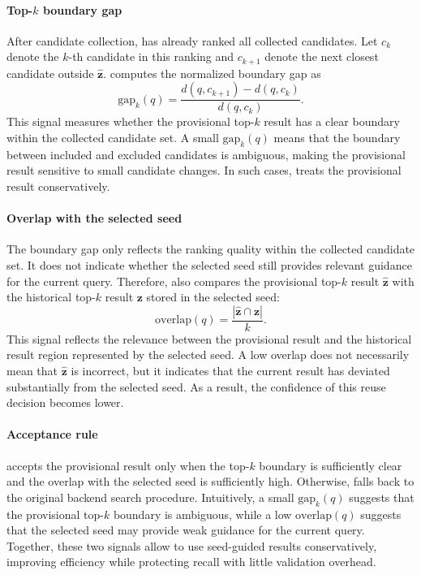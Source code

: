\paragraph{Top-$k$ boundary gap}
After candidate collection, \system has already ranked all collected candidates.
Let $c_k$ denote the $k$-th candidate in this ranking and $c_{k+1}$ denote the next closest candidate outside $\hat{\mathbf{z}}$.
\system computes the normalized boundary gap as
\begin{equation}
\mathrm{gap}_k(q)=
\frac{d(q,c_{k+1})-d(q,c_k)}
{d(q,c_k)}.
\end{equation}
This signal measures whether the provisional top-$k$ result has a clear boundary within the collected candidate set.
A small $\mathrm{gap}_k(q)$ means that the boundary between included and excluded candidates is ambiguous, making the provisional result sensitive to small candidate changes.
In such cases, \system treats the provisional result conservatively.

\paragraph{Overlap with the selected seed}
The boundary gap only reflects the ranking quality within the collected candidate set.
It does not indicate whether the selected seed still provides relevant guidance for the current query.
Therefore, \system also compares the provisional top-$k$ result $\hat{\mathbf{z}}$ with the historical top-$k$ result $\mathbf{z}$ stored in the selected seed:
\begin{equation}
\mathrm{overlap}(q)=
\frac{|\hat{\mathbf{z}}\cap \mathbf{z}|}{k}.
\end{equation}
This signal reflects the relevance between the provisional result and the historical result region represented by the selected seed.
A low overlap does not necessarily mean that $\hat{\mathbf{z}}$ is incorrect, but it indicates that the current result has deviated substantially from the selected seed.
As a result, the confidence of this reuse decision becomes lower.


\paragraph{Acceptance rule}
\system accepts the provisional result only when the top-$k$ boundary is sufficiently clear and the overlap with the selected seed is sufficiently high.
Otherwise, \system falls back to the original backend search procedure.
Intuitively, a small $\mathrm{gap}_k(q)$ suggests that the provisional top-$k$ boundary is ambiguous, while a low $\mathrm{overlap}(q)$ suggests that the selected seed may provide weak guidance for the current query.
Together, these two signals allow \system to use seed-guided results conservatively, improving efficiency while protecting recall with little validation overhead.





